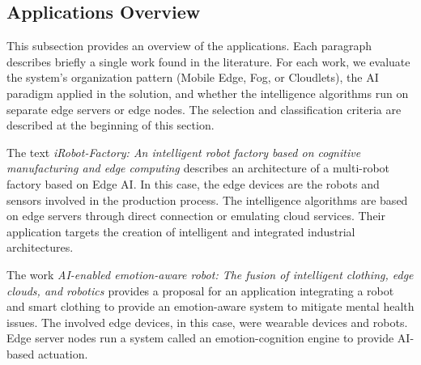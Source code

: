 \subsection{Applications Overview}

This subsection provides an overview of the applications. Each paragraph describes briefly a single work found in the literature. For each work, we evaluate the system's organization pattern (Mobile Edge, Fog, or Cloudlets), the AI paradigm applied in the solution, and whether the intelligence algorithms run on separate edge servers or edge nodes. The selection and classification criteria are described at the beginning of this section. 


The text \textit{iRobot-Factory: An intelligent robot factory based on cognitive manufacturing and edge computing \cite{hu2019irobot}} describes an architecture of a multi-robot factory based on Edge AI. In this case, the edge devices are the robots and sensors involved in the production process. The intelligence algorithms are based on edge servers through direct connection or emulating cloud services. Their application targets the creation of intelligent and integrated industrial architectures.



The work \textit{AI-enabled emotion-aware robot: The fusion of intelligent clothing, edge clouds, and robotics \cite{yang2020ai}} provides a proposal for an application integrating a robot and smart clothing to provide an emotion-aware system to mitigate mental health issues. The involved edge devices, in this case, were wearable devices and robots. Edge server nodes run a system called an emotion-cognition engine to provide AI-based actuation.


